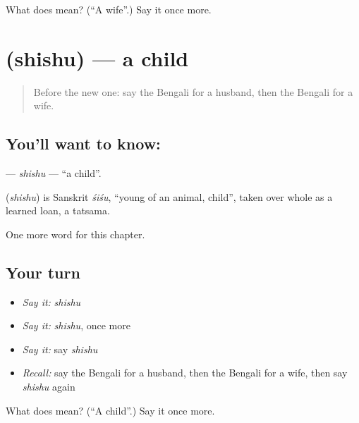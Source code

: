 \begin{tcolorbox}[breakable,colback=teal!4,colframe=teal!35!black,title={Before you move on}]
What does  mean? (\textquotedblleft{}A wife\textquotedblright{}.) Say it once more.
\end{tcolorbox}
\section[\texorpdfstring{\bn{শিশু} (shishu)}{শিশু (shishu)}]{ (shishu) — a child}

\label{lesson:BN-C47-shishu}



\begin{quote}
Before the new one: say the Bengali for a husband, then the Bengali for a wife.
\end{quote}

\subsection*{You'll want to know: }
\textbf{} — \emph{shishu} — \textquotedblleft{}a child\textquotedblright{}.

\begin{cousinweb}
\textbf{} (\emph{shishu}) is Sanskrit \emph{śiśu}, \textquotedblleft{}young of an animal, child\textquotedblright{}, taken over whole as a learned loan, a tatsama.
\end{cousinweb}

\begin{grammarlens}[title={What you've built}]
One more word for this chapter.
\end{grammarlens}

\subsection*{Your turn}
\begin{itemize}
\raggedright
  \item \emph{Say it:} \emph{shishu}
  \item \emph{Say it:} \emph{shishu}, once more
  \item \emph{Say it:} say \emph{shishu}
  \item \emph{Recall:} say the Bengali for a husband, then the Bengali for a wife, then say \emph{shishu} again
\end{itemize}

\begin{tcolorbox}[breakable,colback=teal!4,colframe=teal!35!black,title={Before you move on}]
What does  mean? (\textquotedblleft{}A child\textquotedblright{}.) Say it once more.
\end{tcolorbox}

